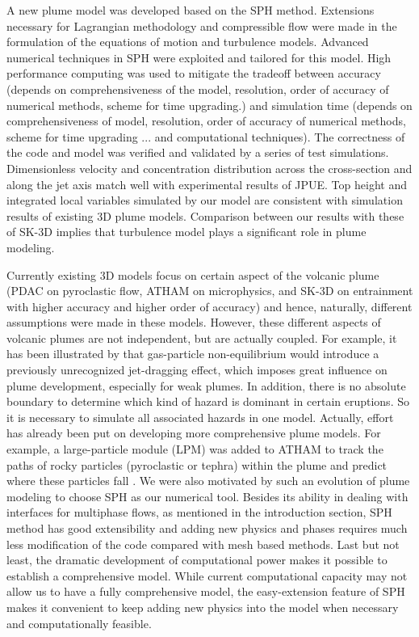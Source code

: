 \documentclass[journal abbreviation, manuscript]{copernicus}
\begin{document}
\conclusions  \label{sec:conclusion}%
A new plume model was developed based on the SPH method. Extensions necessary for Lagrangian methodology and compressible flow were made in the formulation of the equations of motion and turbulence models. Advanced numerical techniques in SPH were exploited and tailored for this model. High performance computing was used to mitigate the tradeoff between accuracy (depends on comprehensiveness of the model, resolution, order of accuracy of numerical methods, scheme for time upgrading.) and simulation time (depends on comprehensiveness of model, resolution, order of accuracy of numerical methods, scheme for time upgrading ... and computational techniques). The correctness of the code and model was verified and validated by a series of test simulations. Dimensionless velocity and concentration distribution across the cross-section and along the jet axis match well with experimental results of JPUE. Top height and integrated local variables simulated by our model are consistent with simulation results of existing 3D plume models. Comparison between our results with these of SK-3D implies that turbulence model plays a significant role in plume modeling.

Currently existing 3D models focus on certain aspect of the volcanic plume (PDAC on pyroclastic flow, ATHAM on microphysics, and SK-3D on entrainment with higher accuracy and higher order of accuracy) and hence, naturally, different assumptions were made in these models. However, these different aspects of volcanic plumes are not independent, but are actually coupled. For example, it has been illustrated by \cite{cerminara2016large} that gas-particle non-equilibrium would introduce a previously unrecognized jet-dragging effect, which imposes great influence on plume development, especially for weak plumes. In addition, there is no absolute boundary to determine which kind of hazard is dominant in certain eruptions. So it is necessary to simulate all associated hazards in one model. Actually, effort has already been put on developing more comprehensive plume models. For example, a large-particle module (LPM) was added to ATHAM to track the paths of rocky particles (pyroclastic or tephra) within the plume and predict where these particles fall \citep{kobs2009modeling}. We were also motivated by such an evolution of plume modeling to choose SPH as our numerical tool. Besides its ability in dealing with interfaces for multiphase flows, as mentioned in the introduction section, SPH method has good extensibility and adding new physics and phases requires much less modification of the code compared with mesh based methods. Last but not least, the dramatic development of computational power makes it possible to establish a comprehensive model. While current computational capacity may not allow us to have a fully comprehensive model, the easy-extension feature of SPH makes it convenient to keep adding new physics into the model when necessary and computationally feasible. 
\end{document}
